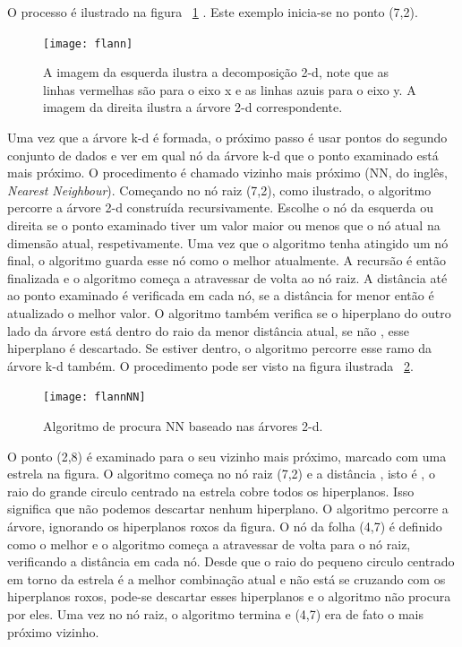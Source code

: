 O processo é ilustrado na figura ~\ref{fig:flann} . Este exemplo inicia-se no ponto (7,2).

\begin{figure}[h!] %
	\begin{center}
		\leavevmode		
		\texttt{[image: flann]}
		\caption{A imagem da esquerda ilustra a decomposição 2-d, note que as linhas vermelhas são para o eixo x e as linhas azuis para o eixo y. A imagem da direita ilustra a árvore 2-d correspondente.}
		\label{fig:flann}
	\end{center}
\end{figure}

Uma vez que a árvore k-d é formada, o próximo passo é usar pontos do segundo conjunto de dados e ver em qual nó da árvore k-d que o ponto examinado está mais próximo. O procedimento é chamado vizinho mais próximo (NN, do inglês, \textit{Nearest Neighbour}). Começando no nó raiz (7,2), como ilustrado, o algoritmo percorre a árvore 2-d construída recursivamente. Escolhe o nó da esquerda ou direita se o ponto examinado tiver um valor maior ou menos que o nó atual na dimensão atual, respetivamente. Uma vez que o algoritmo tenha atingido um nó final, o algoritmo guarda esse nó como o melhor atualmente. A recursão é então finalizada e o algoritmo começa a atravessar de volta ao nó raiz. A distância até ao ponto examinado é verificada em cada nó, se a distância for menor então é atualizado o melhor valor. O algoritmo também verifica se o hiperplano do outro lado da árvore está dentro do raio da menor distância atual, se não , esse hiperplano é descartado. Se estiver dentro, o algoritmo percorre esse ramo da árvore k-d também. O procedimento pode ser visto na figura ilustrada ~\ref{fig:flannNN}.

\begin{figure}[h!] %
	\begin{center}
		\leavevmode		
		\texttt{[image: flannNN]}
		\caption{Algoritmo de procura NN baseado nas árvores 2-d.}
		\label{fig:flannNN}
	\end{center}
\end{figure}

O ponto (2,8) é examinado para o seu vizinho mais próximo, marcado com uma estrela na figura. O algoritmo começa no nó raiz (7,2) e a distância , isto é , o raio do grande circulo centrado na estrela cobre todos os hiperplanos. Isso significa que não podemos descartar nenhum hiperplano. O algoritmo percorre a árvore, ignorando os hiperplanos roxos da figura. O nó da folha (4,7) é definido como o melhor e o algoritmo começa a atravessar de volta para o nó raiz, verificando a distância em cada nó. Desde que o raio do pequeno circulo centrado em torno da estrela é a melhor combinação atual e não está se cruzando com os hiperplanos roxos, pode-se descartar esses hiperplanos e o algoritmo não procura por eles. Uma vez no nó raiz, o algoritmo termina e (4,7) era de fato o mais próximo vizinho.

